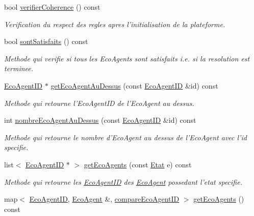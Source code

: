 \begin{CompactItemize}
bool \hyperlink{classPlateformeEcoResolution_0d35ee702a0b255f0da91aa382089865}{verifierCoherence} () const 
\begin{CompactList}\small\item\em Verification du respect des regles apres l'initialisation de la plateforme. \item\end{CompactList}\item 
bool \hyperlink{classPlateformeEcoResolution_673b4d17360ab1ff1e7c7f28a1b2e35e}{sontSatisfaits} () const 
\begin{CompactList}\small\item\em Methode qui verifie si tous les EcoAgents sont satisfaits i.e. si la resolution est terminee. \item\end{CompactList}\item 
\hyperlink{classEcoAgentID}{EcoAgentID} $\ast$ \hyperlink{classPlateformeEcoResolution_a33074c437f57bf9f409502de82b2f58}{getEcoAgentAuDessus} (const \hyperlink{classEcoAgentID}{EcoAgentID} \&id) const 
\begin{CompactList}\small\item\em Methode qui retourne l'EcoAgentID de l'EcoAgent au dessus. \item\end{CompactList}\item 
int \hyperlink{classPlateformeEcoResolution_bccb426d9f1113e66b652bb63e7fafcd}{nombreEcoAgentAuDessus} (const \hyperlink{classEcoAgentID}{EcoAgentID} \&id) const 
\begin{CompactList}\small\item\em Methode qui retourne le nombre d'EcoAgent au dessus de l'EcoAgent avec l'id specifie. \item\end{CompactList}\item 
list$<$ \hyperlink{classEcoAgentID}{EcoAgentID} $\ast$ $>$ \hyperlink{classPlateformeEcoResolution_eccbbf85153147e551b9b6fa65f554e2}{getEcoAgents} (const \hyperlink{etat_8hpp_767b7a63d7677f92d697621b4166af1b}{Etat} e) const 
\begin{CompactList}\small\item\em Methode qui retourne les \hyperlink{classEcoAgentID}{EcoAgentID} des \hyperlink{classEcoAgent}{EcoAgent} possedant l'etat specifie. \item\end{CompactList}\item 
map$<$ \hyperlink{classEcoAgentID}{EcoAgentID}, \hyperlink{classEcoAgent}{EcoAgent} \&, \hyperlink{structcompareEcoAgentID}{compareEcoAgentID} $>$ \hyperlink{classPlateformeEcoResolution_c3c3307a04fbe2d33c753c2b0eef79af}{getEcoAgents} () const 

\end{CompactItemize}

